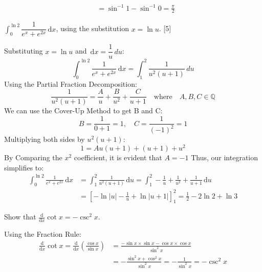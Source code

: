 \documentclass[12pt, a4 paper]{article}
\begin{document}
\begin{outline}[enumerate]
\begin{answer}
\begin{align*}
			                                                               & = \sin^{-1}1-\sin^{-1}0 = \frac{\pi}{2}                           
		\end{align*}
	\end{answer}
	\2 $\int_0^{\ln2} \dfrac{1}{e^x+e^{2x}}\,\mathrm{d}x$, using the substitution $x = \ln u$. \hfill[5]
	\begin{answer}
		Substituting $x=\ln u$ and $\,\mathrm{d}x = \dfrac{1}{u} \,du$:
		\begin{equation*}
			\int_0^{\ln2} \frac{1}{e^x+e^{2x}}\,\mathrm{d}x = \int_1^2 \frac{1}{u^2(u+1)}\,du
		\end{equation*}
		Using the Partial Fraction Decomposition:
		\begin{equation*}
			\frac{1}{u^2(u+1)} = \frac{A}{u} + \frac{B}{u^2} + \frac{C}{u+1} \quad \textrm{where} \quad A,B,C\in\mathbb{Q}
		\end{equation*}
		We can use the Cover-Up Method to get B and C:
		\begin{equation*}
			B = \frac{1}{0+1}=1, \quad C = \frac{1}{(-1)^2} = 1
		\end{equation*}
		Multiplying both sides by $u^2(u+1)$:
		\begin{equation*}
			1 = Au(u+1) + (u+1) + u^2
		\end{equation*}
		By Comparing the $x^2$ coefficient, it is evident that $A=-1$ Thus, our integration simplifies to:
		\begin{align*}
			\int_0^{\ln2} \frac{1}{e^x+e^{2x}}\,\mathrm{d}x & = \int_1^2 \frac{1}{u^2(u+1)}\,\mathrm{d}u =\int_1^2 -\frac{1}{u} + \frac{1}{u^2} + \frac{1}{u+1} \,\mathrm{d}u \\
			                                                & = [-\ln{|u|}-\frac{1}{u}+\ln{|u+1|}]_1^2 = \frac{1}{2}-2\ln{2}+\ln{3}                                           
		\end{align*}
	\end{answer}
	\1 Show that ${\frac{\mathrm{d}}{\mathrm{d}x}}\cot{x}= -\csc^2x$.\\
	\begin{answer}
		Using the Fraction Rule:
		\begin{align*}
			{\frac{\mathrm{d}}{\mathrm{d}x}}\cot{x} = {\frac{\mathrm{d}}{\mathrm{d}x}}(\frac{\cos x}{\sin x}) & = \frac{-\sin x \times \sin x - \cos x \times \cos x}{\sin^2 x}          \\
			                                                                                                  & = -\frac{\sin^2 x + \cos^2 x}{\sin^2 x} = -\frac{1}{\sin^2 x} = -\csc^2x 

\end{align*}
\end{answer}
\end{outline}
\end{document}
